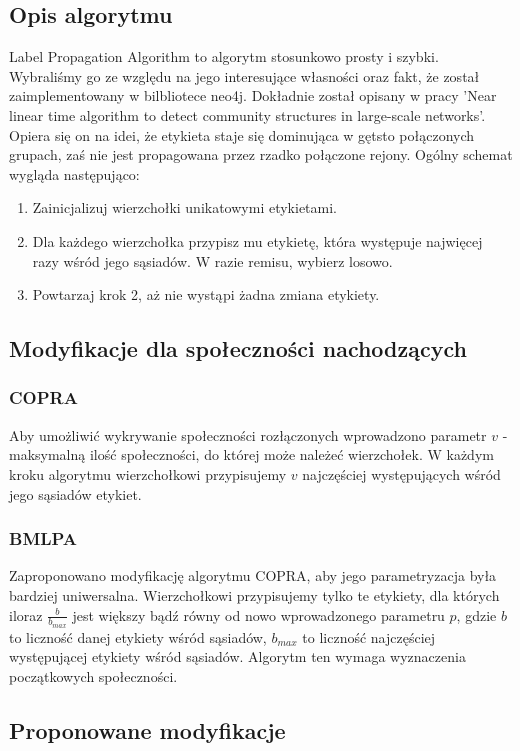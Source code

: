 \documentclass{article}
\begin{document}
\subsection{Opis algorytmu}
Label Propagation Algorithm to algorytm stosunkowo prosty i szybki. Wybraliśmy go ze względu na jego interesujące własności oraz fakt, że został zaimplementowany w bilbliotece neo4j. Dokładnie został opisany w pracy 'Near linear time algorithm to detect community structures in large-scale networks'\cite{ms-paper2}. Opiera się on na idei, że etykieta staje się dominująca w gętsto połączonych grupach, zaś nie jest propagowana przez rzadko połączone rejony. Ogólny schemat wygląda następująco:
\begin{enumerate}
\item Zainicjalizuj wierzchołki unikatowymi etykietami.
\item Dla każdego wierzchołka przypisz mu etykietę, która występuje najwięcej razy wśród jego sąsiadów. W razie remisu, wybierz losowo.
\item Powtarzaj krok 2, aż nie wystąpi żadna zmiana etykiety.
\end{enumerate}

\subsection{Modyfikacje dla społeczności nachodzących}
\subsubsection{COPRA}
Aby umożliwić wykrywanie społeczności rozłączonych wprowadzono parametr $v$ - maksymalną ilość społeczności, do której może należeć wierzchołek\cite{ms-paper3}. W każdym kroku algorytmu wierzchołkowi przypisujemy $v$ najczęściej występujących wśród jego sąsiadów etykiet.
\subsubsection{BMLPA}
Zaproponowano modyfikację algorytmu COPRA, aby jego parametryzacja była bardziej uniwersalna\cite{ms-paper4}. Wierzchołkowi przypisujemy tylko te etykiety, dla których iloraz $\frac{b}{b_{max}}$ jest większy bądź równy od nowo wprowadzonego parametru $p$, gdzie $b$ to liczność danej etykiety wśród sąsiadów, $b_{max}$ to liczność najczęściej występującej etykiety wśród sąsiadów. Algorytm ten wymaga wyznaczenia początkowych społeczności.

\subsection{Proponowane modyfikacje}
\end{document}

